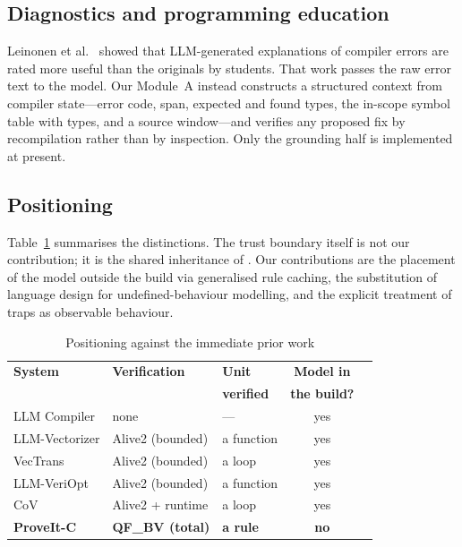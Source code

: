 \documentclass[conference]{IEEEtran}
\begin{document}
\subsection{Diagnostics and programming education}

Leinonen et al.~\cite{sigcse} showed that LLM-generated explanations of
compiler errors are rated more useful than the originals by students. That work
passes the raw error text to the model. Our Module~A instead constructs a
structured context from compiler state---error code, span, expected and found
types, the in-scope symbol table with types, and a source window---and verifies
any proposed fix by recompilation rather than by inspection. Only the grounding
half is implemented at present.

\subsection{Positioning}

Table~\ref{tab:related} summarises the distinctions. The trust boundary itself
is not our contribution; it is the shared inheritance of
\cite{llmvectorizer,llmveriopt,cov}. Our contributions are the placement of the
model outside the build via generalised rule caching, the substitution of
language design for undefined-behaviour modelling, and the explicit treatment
of traps as observable behaviour.

\begin{table}[t]
\caption{Positioning against the immediate prior work}
\label{tab:related}
\centering
\footnotesize
\setlength{\tabcolsep}{3pt}
\begin{tabular}{@{}lllc l@{}}
\toprule
\textbf{System} & \textbf{Verification} & \textbf{Unit} &
\textbf{Model in} \\
 & & \textbf{verified} & \textbf{the build?} \\
\midrule
LLM Compiler & none & --- & yes \\
LLM-Vectorizer & Alive2 (bounded) & a function & yes \\
VecTrans & Alive2 (bounded) & a loop & yes \\
LLM-VeriOpt & Alive2 (bounded) & a function & yes \\
CoV & Alive2 + runtime & a loop & yes \\
\textbf{ProveIt-C} & \textbf{QF\_BV (total)} & \textbf{a rule} &
\textbf{no} \\
\bottomrule
\end{tabular}
\end{table}
\end{document}
